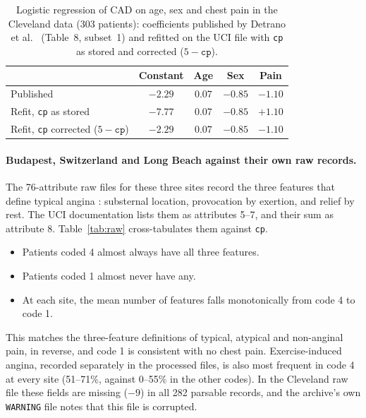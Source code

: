 \documentclass[11pt]{article}
\begin{document}
\begin{table}[t]
\centering
\caption{Logistic regression of CAD on age, sex and chest pain in the Cleveland data (303 patients): coefficients published by Detrano et al.~\cite{detrano1986} (Table~8, subset~1) and refitted on the UCI file with \texttt{cp} as stored and corrected ($5-\texttt{cp}$).}\label{tab:coef}
\begin{tabular}{lcccc}
\toprule
 & Constant & Age & Sex & Pain\\
\midrule
Published & $-2.29$ & $0.07$ & $-0.85$ & $-1.10$\\
Refit, \texttt{cp} as stored & $-7.77$ & $0.07$ & $-0.85$ & $+1.10$\\
Refit, \texttt{cp} corrected ($5-\texttt{cp}$) & $-2.29$ & $0.07$ & $-0.85$ & $-1.10$\\
\bottomrule
\end{tabular}
\end{table}

\paragraph{Budapest, Switzerland and Long Beach against their own raw records.}
The 76-attribute raw files for these three sites record the three features that define typical angina \cite{diamond1983}: substernal location, provocation by exertion, and relief by rest. The UCI documentation lists them as attributes 5--7, and their sum as attribute 8. Table~\ref{tab:raw} cross-tabulates them against \texttt{cp}.
\begin{itemize}
\item Patients coded 4 almost always have all three features.
\item Patients coded 1 almost never have any.
\item At each site, the mean number of features falls monotonically from code 4 to code 1.
\end{itemize}
This matches the three-feature definitions of typical, atypical and non-anginal pain, in reverse, and code 1 is consistent with no chest pain. Exercise-induced angina, recorded separately in the processed files, is also most frequent in code 4 at every site (51--71\%, against 0--55\% in the other codes). %
In the Cleveland raw file these fields are missing ($-9$) in all 282 parsable records, and the archive's own \texttt{WARNING} file notes that this file is corrupted.
\end{document}
